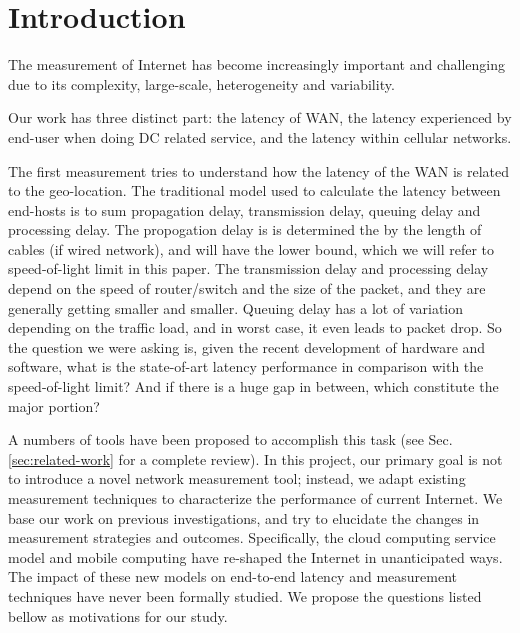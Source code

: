 \section{Introduction}
\label{sec:introduction}

The measurement of Internet has become increasingly important and challenging due to its complexity, large-scale, heterogeneity and variability. 


Our work has three distinct part: the latency of WAN, the latency experienced by end-user when doing DC related service, and the latency within cellular networks.

The first measurement tries to understand how the latency of the WAN is related to the geo-location. The traditional model used to calculate the latency between end-hosts is to sum propagation delay, transmission delay, queuing delay and processing delay. The propogation delay is is determined the by the length of cables (if wired network), and will have the lower bound, which we will refer to speed-of-light limit in this paper. The transmission delay and processing delay depend on the speed of router/switch and the size of the packet, and they are generally getting smaller and smaller. Queuing delay has a lot of variation depending on the traffic load, and in worst case, it even leads to packet drop. So the question we were asking is, given the recent development of hardware and software, what is the state-of-art latency performance in comparison with the speed-of-light limit? And if there is a huge gap in between, which constitute the major portion? 




A numbers of tools have been proposed to accomplish this task (see Sec.\,\ref{sec:related-work} for a complete review). In this project, our primary goal is not to introduce a novel network measurement tool; instead, we adapt existing measurement techniques to characterize the performance of current Internet. We base our work on previous investigations, and try to elucidate the changes in measurement strategies and outcomes. Specifically, the cloud computing service model and mobile computing have re-shaped the Internet in unanticipated ways. The impact of these new models on end-to-end latency and measurement techniques have never been formally studied. We propose the questions listed bellow as motivations for our study.

